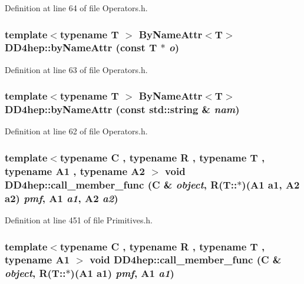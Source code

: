 Definition at line 64 of file Operators.h.\hypertarget{namespace_d_d4hep_ad95ad64fdeccbdfcba2f4dd5c7c607b7}{
\subsubsection[{byNameAttr}]{\setlength{\rightskip}{0pt plus 5cm}template$<$typename T $>$ {\bf ByNameAttr}$<${\bf T}$>$ DD4hep::byNameAttr (const {\bf T} $\ast$ {\em o})}}
\label{namespace_d_d4hep_ad95ad64fdeccbdfcba2f4dd5c7c607b7}


Definition at line 63 of file Operators.h.\hypertarget{namespace_d_d4hep_af7f61d433d5cb1c4e6184ff5f2ef323d}{
\subsubsection[{byNameAttr}]{\setlength{\rightskip}{0pt plus 5cm}template$<$typename T $>$ {\bf ByNameAttr}$<${\bf T}$>$ DD4hep::byNameAttr (const std::string \& {\em nam})}}
\label{namespace_d_d4hep_af7f61d433d5cb1c4e6184ff5f2ef323d}


Definition at line 62 of file Operators.h.\hypertarget{namespace_d_d4hep_ad6f8e017a88c5eb91e10497ca54035ed}{
\subsubsection[{call\_\-member\_\-func}]{\setlength{\rightskip}{0pt plus 5cm}template$<$typename C , typename R , typename T , typename A1 , typename A2 $>$ void DD4hep::call\_\-member\_\-func (C \& {\em object}, \/  R(T::$\ast$)(A1 a1, A2 a2) {\em pmf}, \/  A1 {\em a1}, \/  A2 {\em a2})}}
\label{namespace_d_d4hep_ad6f8e017a88c5eb91e10497ca54035ed}


Definition at line 451 of file Primitives.h.\hypertarget{namespace_d_d4hep_ac8658f9383f577e756131df133817f9f}{
\subsubsection[{call\_\-member\_\-func}]{\setlength{\rightskip}{0pt plus 5cm}template$<$typename C , typename R , typename T , typename A1 $>$ void DD4hep::call\_\-member\_\-func (C \& {\em object}, \/  R(T::$\ast$)(A1 a1) {\em pmf}, \/  A1 {\em a1})}}
\label{namespace_d_d4hep_ac8658f9383f577e756131df133817f9f}


